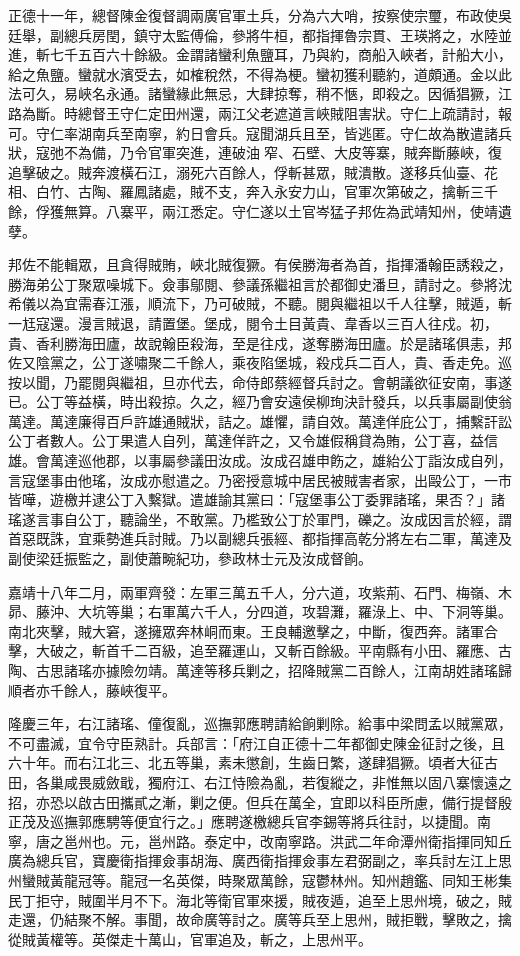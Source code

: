 \begin{pinyinscope}
正德十一年，總督陳金復督調兩廣官軍土兵，分為六大哨，按察使宗璽，布政使吳廷舉，副總兵房閏，鎮守太監傅倫，參將牛桓，都指揮魯宗貫、王瑛將之，水陸並進，斬七千五百六十餘級。金謂諸蠻利魚鹽耳，乃與約，商船入峽者，計船大小，給之魚鹽。蠻就水濱受去，如榷稅然，不得為梗。蠻初獲利聽約，道頗通。金以此法可久，易峽名永通。諸蠻緣此無忌，大肆掠奪，稍不愜，即殺之。因循猖獗，江路為斷。時總督王守仁定田州還，兩江父老遮道言峽賊阻害狀。守仁上疏請討，報可。守仁率湖南兵至南寧，約日會兵。寇聞湖兵且至，皆逃匿。守仁故為散遣諸兵狀，寇弛不為備，乃令官軍突進，連破油窄、石壁、大皮等寨，賊奔斷藤峽，復追擊破之。賊奔渡橫石江，溺死六百餘人，俘斬甚眾，賊潰散。遂移兵仙臺、花相、白竹、古陶、羅鳳諸處，賊不支，奔入永安力山，官軍次第破之，擒斬三千餘，俘獲無算。八寨平，兩江悉定。守仁遂以土官岑猛子邦佐為武靖知州，使靖遺孽。

邦佐不能輯眾，且貪得賊賄，峽北賊復獗。有侯勝海者為首，指揮潘翰臣誘殺之，勝海弟公丁聚眾噪城下。僉事鄔閱、參議孫繼祖言於都御史潘旦，請討之。參將沈希儀以為宜需春江漲，順流下，乃可破賊，不聽。閱與繼祖以千人往擊，賊遁，斬一尪寇還。漫言賊退，請置堡。堡成，閱令土目黃貴、韋香以三百人往戍。初，貴、香利勝海田廬，故說翰臣殺海，至是往戍，遂奪勝海田廬。於是諸瑤俱恚，邦佐又陰黨之，公丁遂嘯聚二千餘人，乘夜陷堡城，殺戍兵二百人，貴、香走免。巡按以聞，乃罷閱與繼祖，旦亦代去，命侍郎蔡經督兵討之。會朝議欲征安南，事遂已。公丁等益橫，時出殺掠。久之，經乃會安遠侯柳珣決計發兵，以兵事屬副使翁萬達。萬達廉得百戶許雄通賊狀，詰之。雄懼，請自效。萬達佯庇公丁，捕繫訐訟公丁者數人。公丁果遣人自列，萬達佯許之，又令雄假稱貸為賄，公丁喜，益信雄。會萬達巡他郡，以事屬參議田汝成。汝成召雄申飭之，雄紿公丁詣汝成自列，言寇堡事由他瑤，汝成亦慰遣之。乃密授意城中居民被賊害者家，出毆公丁，一市皆嘩，遊檄并逮公丁入繫獄。遣雄諭其黨曰：「寇堡事公丁委罪諸瑤，果否？」諸瑤遂言事自公丁，聽論坐，不敢黨。乃檻致公丁於軍門，礫之。汝成因言於經，謂首惡既誅，宜乘勢進兵討賊。乃以副總兵張經、都指揮高乾分將左右二軍，萬達及副使梁廷振監之，副使蕭畹紀功，參政林士元及汝成督餉。

嘉靖十八年二月，兩軍齊發：左軍三萬五千人，分六道，攻紫荊、石門、梅嶺、木昴、藤沖、大坑等巢；右軍萬六千人，分四道，攻碧灘，羅淥上、中、下洞等巢。南北夾擊，賊大窘，遂擁眾奔林峒而東。王良輔邀擊之，中斷，復西奔。諸軍合擊，大破之，斬首千二百級，追至羅運山，又斬百餘級。平南縣有小田、羅應、古陶、古思諸瑤亦據險勿靖。萬達等移兵剿之，招降賊黨二百餘人，江南胡姓諸瑤歸順者亦千餘人，藤峽復平。

隆慶三年，右江諸瑤、僮復亂，巡撫郭應聘請給餉剿除。給事中梁問孟以賊黨眾，不可盡滅，宜令守臣熟計。兵部言：「府江自正德十二年都御史陳金征討之後，且六十年。而右江北三、北五等巢，素未懲創，生齒日繁，遂肆猖獗。頃者大征古田，各巢咸畏威斂戢，獨府江、右江恃險為亂，若復縱之，非惟無以固八寨懷遠之招，亦恐以啟古田攜貳之漸，剿之便。但兵在萬全，宜即以科臣所慮，備行提督殷正茂及巡撫郭應騁等便宜行之。」應聘遂檄總兵官李錫等將兵往討，以捷聞。南寧，唐之邕州也。元，邕州路。泰定中，改南寧路。洪武二年命潭州衛指揮同知丘廣為總兵官，寶慶衛指揮僉事胡海、廣西衛指揮僉事左君弼副之，率兵討左江上思州蠻賊黃龍冠等。龍冠一名英傑，時聚眾萬餘，寇鬱林州。知州趙鑑、同知王彬集民丁拒守，賊圍半月不下。海北等衛官軍來援，賊夜遁，追至上思州境，破之，賊走還，仍結聚不解。事聞，故命廣等討之。廣等兵至上思州，賊拒戰，擊敗之，擒從賊黃權等。英傑走十萬山，官軍追及，斬之，上思州平。


\end{pinyinscope}

